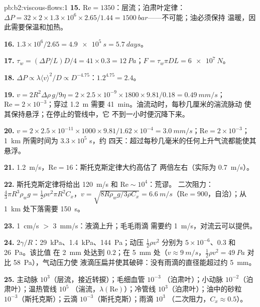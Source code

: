 \begin{solution}{pb:b2:viscous-flows:1}
\textbf{15.} $\mathrm{Re} = 1350$：层流；泊肃叶定律：$\Delta P = 32 \times 2 \times 1.3 \times
10^6 \times 2.65/1.44 = \qty{1500}{bar}$——不可能；油必须保持
温暖，因此需要保温和加热。

\textbf{16.} $1.3 \times 10^6/2.65 = \qty{4.9e5}{s} = \qty{5.7}{days}$。

\textbf{17.} $\tau_w = (\Delta P/L)D/4 = 41 \times 0.3 = \qty{12}{Pa}$；$F = \tau_w\pi DL =
\qty{6e7}{N}$。

\textbf{18.} $\Delta P \propto \lambda\langle v\rangle^2/D \propto D^{-4.75}$：$1.2^{4.75} = 2.4$。

\textbf{19.} $v = 2R^2\Delta\rho\,g/9\eta = 2 \times 2.5 \times 10^{-9} \times 1800 \times 9.81/
0.18 = \qty{0.49}{mm/s}$；$\mathrm{Re} = 2 \times 10^{-3}$；穿过
\qty{1.2}{m} 需要 \qty{41}{min}。油流动时，每秒几厘米的湍流脉动
使其保持悬浮；在停止的管线中，它
不到一小时便沉降下来。

\textbf{20.} $v = 2 \times 2.5 \times 10^{-11} \times 1000 \times 9.81/1.62 \times 10^{-4} =
\qty{3.0}{mm/s}$；$\mathrm{Re} = 2 \times 10^{-3}$；\qty{1}{km} 所需时间为 $3.3 \times 10^5$ s，约
四天：超过每秒几毫米的任何上升气流都能使其悬浮。

\textbf{21.} \qty{1.2}{m/s}，$\mathrm{Re} = 16$：斯托克斯定律大约高估了
两倍左右（实际为 \qty{0.7}{m/s}）。

\textbf{22.} 斯托克斯定律将给出 \qty{120}{m/s} 和 $\mathrm{Re} \sim 10^4$：荒谬。
二次阻力：$\tfrac43\pi R^3\rho_wg = \tfrac12\rho v^2\pi R^2C_x$，$v = \sqrt{8R
\rho_wg/3\rho C_x} = \qty{6.6}{m/s}$（$\mathrm{Re} = 900$，自洽）；从
\qty{1}{km} 处下落需要 \qty{150}{s}。

\textbf{23.} \qty{1}{cm/s} $>$ \qty{3}{mm/s}：液滴上升；毛毛雨滴
需要约 \qty{1}{m/s}，对流云可以提供。

\textbf{24.} $2\gamma/R$：\qty{29}{kPa}、\qty{1.4}{kPa}、\qty{144}{Pa}；动压
$\tfrac12\rho v^2$ 分别为 $5 \times 10^{-6}$、$0.3$ 和 \qty{26}{Pa}。该比值
在 \qty{2}{mm} 处达到 $0.2$；在 \qty{5}{mm} 处（$v \approx \qty{9}{m/s}$，$\tfrac12\rho v^2 =
\qty{49}{Pa}$ 对比 \qty{58}{Pa}），气动压力使
液滴压扁并使其破碎：没有雨滴的直径能超过约 \qty{5}{mm}。

\textbf{25.} 主动脉 $10^3$（层流，接近转捩）；毛细血管 $10^{-3}$
（泊肃叶）；小动脉 $10^{-2}$（泊肃叶）；温热管线 $10^5$
（湍流，$\lambda(\mathrm{Re})$）；冷管线 $10^3$（泊肃叶）；油中的砂粒
$10^{-3}$（斯托克斯）；云滴 $10^{-3}$（斯托克斯）；雨滴 $10^3$
（二次阻力，$C_x \approx 0.5$）。
\end{solution}
